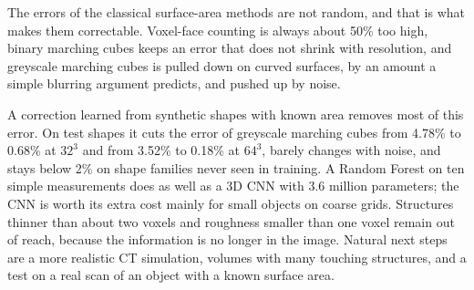 The errors of the classical surface-area methods are not random, and that is what makes them
correctable. Voxel-face counting is always about 50\% too high, binary marching cubes keeps an error that
does not shrink with resolution, and greyscale marching cubes is pulled down on curved surfaces, by an
amount a simple blurring argument predicts, and pushed up by noise.

A correction learned from synthetic shapes with known area removes most of this error. On test shapes
it cuts the error of greyscale marching cubes from 4.78\% to 0.68\% at $32^3$ and from 3.52\% to 0.18\% at
$64^3$, barely changes with noise, and stays below 2\% on shape families never seen in training. A
Random Forest on ten simple measurements does as well as a 3D CNN with 3.6 million parameters; the CNN
is worth its extra cost mainly for small objects on coarse grids. Structures thinner than about two
voxels and roughness smaller than one voxel remain out of reach, because the information is no longer
in the image. Natural next steps are a more realistic CT simulation, volumes with many touching
structures, and a test on a real scan of an object with a known surface area.
